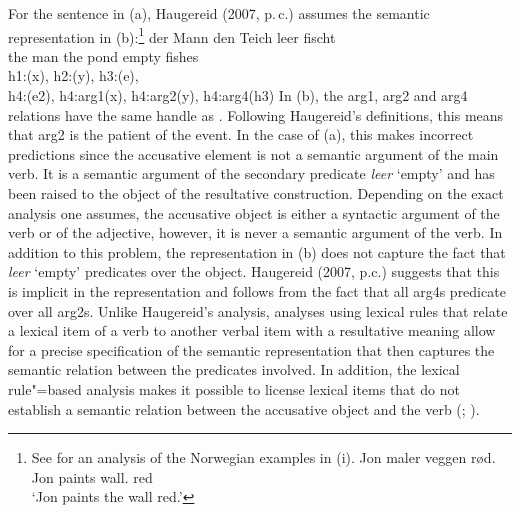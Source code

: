 \begin{exe}
\begin{xlist}[iv.]
\begin{exe}
\begin{xlist}[iv.]
For the sentence in (a), Haugereid (2007, p.\,c.) assumes the semantic representation in (b):\footnote{
  See  for an analysis of the Norwegian examples in (i).
\ea
\gll Jon maler veggen rød.\\
     Jon paints wall. red\\
\glt `Jon paints the wall red.'
\zlast
}
\eal
\ex 
\gll der Mann den Teich leer fischt\\
	 the man the pond empty fishes\\
\ex h1:(x), h2:(y), h3:(e),\\
    h4:(e2), h4:arg1(x), h4:arg2(y), h4:arg4(h3)
\zl
In (b), the arg1, arg2 and arg4 relations have the same handle as . 
Following Haugereid's definitions, this means that arg2 is the patient of the event. In the case of
(a), this makes incorrect predictions since the accusative element is not a semantic argument of the main
verb. It is a semantic argument of the secondary predicate \emph{leer} `empty' and has been raised to the object
of the resultative construction. Depending on the exact analysis one assumes, the accusative object is either a syntactic
argument of the verb or of the adjective, however, it is never a semantic argument of the verb. In addition to this problem,
the representation in (b) does not capture the fact that \emph{leer} `empty' predicates over the object. Haugereid (2007, p.c.) suggests
that this is implicit in the representation and follows from the fact that all arg4s predicate over all arg2s.
Unlike Haugereid's analysis, analyses using lexical rules that relate a lexical item of a verb to
another verbal item with a resultative meaning allow for a precise specification of the semantic representation
that then captures the semantic relation between the predicates involved. In addition, the lexical
rule"=based analysis makes it possible to license lexical items  that do not establish a semantic relation between the accusative object and the verb
(\citealp{Wechsler97a,WN2001a};
\citealp[Chapter~5]{Mueller2002b}).


\end{xlist}
\end{exe}
\end{xlist}
\end{exe}
